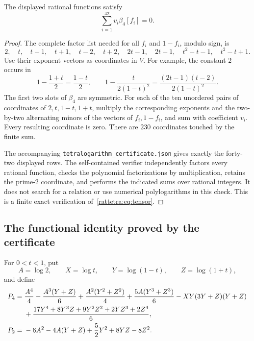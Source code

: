 \begin{lemma}
\label{rattetra:lem:certificate}
The displayed rational functions satisfy
\begin{equation}
 \sum_{i=1}^{42}v_i\beta_4[f_i]=0.
\label{rattetra:eq:tensor}
\end{equation}
\end{lemma}

\begin{proof}
The complete factor list needed for all $f_i$ and $1-f_i$, modulo
sign, is
\[
 2,\quad t,\quad t-1,\quad t+1,\quad
 t-2,\quad t+2,\quad2t-1,\quad2t+1,\quad
 t^2-t-1,\quad t^2-t+1.
\]
Use their exponent vectors as coordinates in $V$. For example,
the constant $2$ occurs in
\[
 1-\frac{1+t}{2}=\frac{1-t}{2},\qquad
 1-\frac{t}{2(1-t)^2}
   =\frac{(2t-1)(t-2)}{2(1-t)^2}.
\]
The first two slots of $\beta_4$ are symmetric. For each of the ten
unordered pairs of coordinates of $2,t,1-t,1+t$, multiply the
corresponding exponents and the two-by-two alternating minors of
the vectors of $f_i,1-f_i$, and sum with coefficient $v_i$.
Every resulting coordinate is zero. There are $230$ coordinates
touched by the finite sum.

The accompanying \texttt{tetralogarithm\_certificate.json} gives
exactly the forty-two displayed rows. The self-contained verifier
independently factors every rational function, checks the polynomial
factorizations by multiplication, retains the prime-$2$ coordinate,
and performs the indicated sums over rational integers. It does not
search for a relation or use numerical polylogarithms in this check.
This is a finite exact verification of~\eqref{rattetra:eq:tensor}.
\end{proof}

\subsection{The functional identity proved by the certificate}

For $0<t<1$, put
\[
 A=\log2,\qquad X=\log t,\qquad
 Y=\log(1-t),\qquad Z=\log(1+t),
\]
and define
\begin{align}
P_4={}&\frac{A^4}{4}-\frac{A^3(Y+Z)}6
       +\frac{A^2(Y^2+Z^2)}4+\frac{5A(Y^3+Z^3)}6
       -XY(3Y+Z)(Y+Z)\notag\\
 &+\frac{17Y^4+8Y^3Z+9Y^2Z^2+2YZ^3+2Z^4}{6},
 \label{rattetra:eq:P4}\\
P_2={}&-6A^2-4A(Y+Z)+\frac52Y^2+8YZ-8Z^2.
 \label{rattetra:eq:P2}
\end{align}

